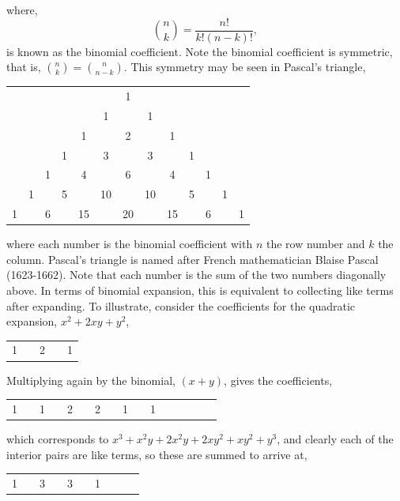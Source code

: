 \documentclass[11pt]{amsart}
\begin{document}
where, $${{n}\choose{k}} = \frac{n!}{k!(n-k)!},$$ is known as the binomial coefficient. Note the binomial coefficient is symmetric, that is, ${{n}\choose{k}} = {{n}\choose{n-k}}$. This symmetry may be seen in Pascal's triangle,

\begin{center}
\begin{tabular}{ccccccccccccc}
&&&&&&1&&&&&& \\
&&&&&1&&1&&&&& \\
&&&&1&&2&&1&&&& \\
&&&1&&3&&3&&1&&& \\
&&1&&4&&6&&4&&1&& \\
&1&&5&&10&&10&&5&&1& \\
1&&6&&15&&20&&15&&6&&1 \\
\end{tabular}
\end{center}

where each number is the binomial coefficient with $n$ the row number and $k$ the column. Pascal's triangle is named after French mathematician Blaise Pascal (1623-1662). Note that each number is the sum of the two numbers diagonally above. In terms of binomial expansion, this is equivalent to collecting like terms after expanding. To illustrate, consider the coefficients for the quadratic expansion, $x^2 + 2xy + y^2$,

\begin{center}
\begin{tabular}{ccccc}
1&&2&&1\\
\end{tabular}
\end{center}

Multiplying again by the binomial, $(x + y)$, gives the coefficients,

\begin{center}
\begin{tabular}{cccccccccccccccc}
1&&1&&2&&2&&1&&1 \\
\end{tabular}
\end{center}

which corresponds to $x^3 + x^2y + 2x^2y + 2xy^2 + xy^2 + y^3$, and clearly each of the interior pairs are like terms, so these are summed to arrive at,

\begin{center}
\begin{tabular}{cccccccccc}
1&&3&&3&&1 \\
\end{tabular}
\end{center}
\end{document}
